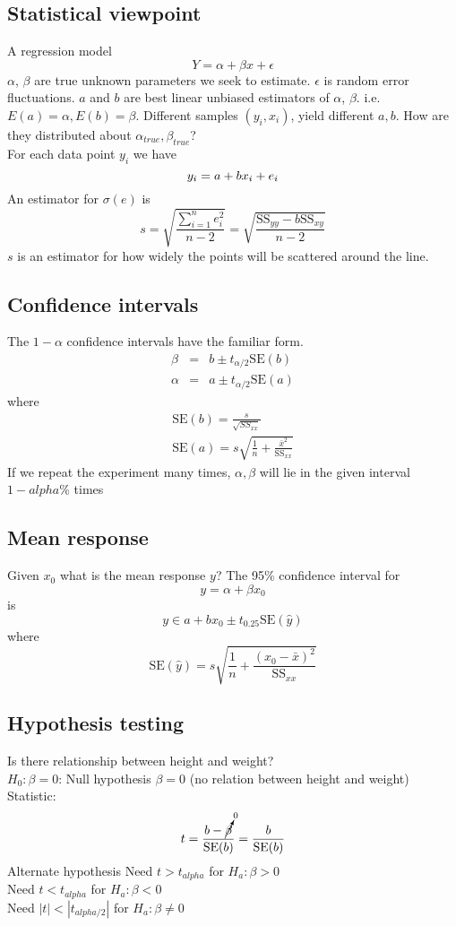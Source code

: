 \documentclass{article}
\newcommand{\beq}{\begin{equation}}
\newcommand{\eeq}{\end{equation}}
\newcommand{\ber}{\begin{eqnarray}}
\newcommand{\eer}{\end{eqnarray}}
\begin{document}
\subsection{Statistical viewpoint}
A regression model
\beq
Y = \alpha + \beta{x} + \epsilon
\eeq
$\alpha$, $\beta$ are true unknown parameters we seek to estimate. $\epsilon$ is random error fluctuations. $a$ and $b$ are best linear unbiased estimators of $\alpha$, $\beta$. i.e. $E(a)=\alpha, E(b)=\beta$. Different samples $(y_i,x_i)$, yield different $a,b$. How are they distributed about $\alpha_{true},\beta_{true}$?\\
For each data point $y_i$ we have
\beq
y_i = a + bx_i + e_i\\
\eeq
An estimator for $\sigma(e)$ is
\beq
s = \sqrt{\frac{\sum_{i=1}^{n}e_i^2}{n-2}} = \sqrt{\frac{\text{SS}_{yy}-b\text{SS}_{xy}}{n-2}}
\eeq
$s$ is an estimator for how widely the points will be scattered around the line.
\subsection{Confidence intervals}
The $1-\alpha$ confidence intervals have the familiar form.
\ber
\beta  &=& b \pm t_{\alpha/2}\text{SE}(b)\\
\alpha &=& a \pm t_{\alpha/2}\text{SE}(a)
\eer
where
\ber
\text{SE}(b) = \frac{s}{\sqrt{SS_{xx}}}\\
\text{SE}(a) = s\sqrt{\frac{1}{n} + \frac{\bar{x}^2}{\text{SS}_{xx}}}
\eer
If we repeat the experiment many times, $\alpha,\beta$ will lie in the given interval $1-alpha$\% times
\subsection{Mean response}
Given $x_0$ what is the mean response $y$? The 95\% confidence interval for
\beq
y = \alpha + \beta{}x_0
\eeq
is
\beq
y \in a + bx_0 \pm t_{0.25}\text{SE}(\hat{y})
\eeq
where
\beq
\text{SE}(\hat{y}) = s\sqrt{\frac{1}{n} + \frac{(x_0 - \bar{x})^2}{\text{SS}_{xx}}}
\eeq
\subsection{Hypothesis testing}
Is there relationship between height and weight?\\
$H_0:\beta=0$: Null hypothesis $\beta=0$ (no relation between height and weight)\\
Statistic:
\beq
t = \frac{b-\cancelto{0}{\beta}}{\text{SE}(b)} = \frac{b}{\text{SE}(b)}
\eeq
Alternate hypothesis
Need $t>t_{alpha}$ for $H_a: \beta>0$\\
Need $t<t_{alpha}$ for $H_a: \beta<0$\\
Need $|t|<|t_{alpha/2}|$ for $H_a: \beta\ne{0}$\\
\end{document}
